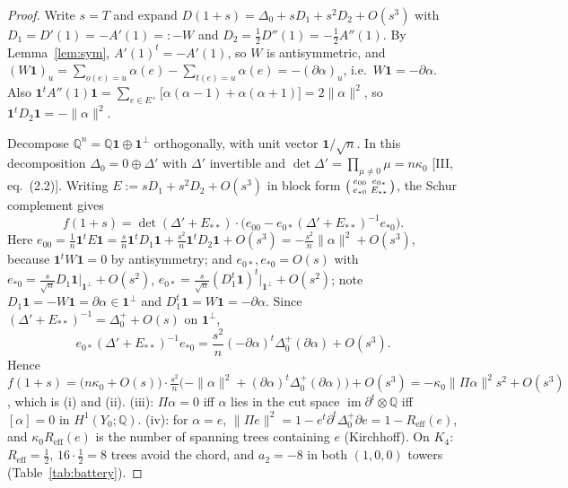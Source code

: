 \documentclass[11pt]{amsart}
\numberwithin{equation}{section}
\theoremstyle{definition}
\theoremstyle{remark}
\newcommand{\Q}{\mathbb{Q}}
\newcommand{\Reff}{R_{\mathrm{eff}}}
\begin{document}
\begin{proof}
Write $s=T$ and expand $D(1+s)=\Delta_0+sD_1+s^{2}D_2+O(s^{3})$ with
$D_1=D'(1)=-A'(1)=:-W$ and $D_2=\frac12D''(1)=-\frac12A''(1)$. By
Lemma~\ref{lem:sym}, $A'(1)^{t}=-A'(1)$, so $W$ is antisymmetric, and
$(W\mathbf1)_u=\sum_{o(e)=u}\alpha(e)-\sum_{t(e)=u}\alpha(e)=-(\partial\alpha)_u$, i.e.\
$W\mathbf1=-\partial\alpha$. Also
$\mathbf1^{t}A''(1)\mathbf1=\sum_{e\in E^+}\bigl[\alpha(\alpha-1)+\alpha(\alpha+1)\bigr]
=2\|\alpha\|^{2}$, so $\mathbf1^{t}D_2\mathbf1=-\|\alpha\|^{2}$.

Decompose $\Q^{n}=\Q\mathbf1\oplus\mathbf1^{\perp}$ orthogonally, with unit vector
$\mathbf1/\sqrt n$. In this decomposition $\Delta_0=0\oplus\Delta'$ with $\Delta'$
invertible and $\det\Delta'=\prod_{\mu\neq0}\mu=n\kappa_0$ [III, eq.~(2.2)]. Writing
$E:=sD_1+s^{2}D_2+O(s^{3})$ in block form $\begin{psmallmatrix}e_{00}&e_{0*}\\
e_{*0}&E_{**}\end{psmallmatrix}$, the Schur complement gives
\[
f(1+s)=\det(\Delta'+E_{**})\cdot\bigl(e_{00}-e_{0*}(\Delta'+E_{**})^{-1}e_{*0}\bigr).
\]
Here $e_{00}=\frac1n\mathbf1^{t}E\mathbf1=\frac{s}{n}\mathbf1^{t}D_1\mathbf1
+\frac{s^{2}}n\mathbf1^{t}D_2\mathbf1+O(s^{3})=-\frac{s^{2}}n\|\alpha\|^{2}+O(s^{3})$,
because $\mathbf1^{t}W\mathbf1=0$ by antisymmetry; and $e_{0*},e_{*0}=O(s)$ with
$e_{*0}=\frac{s}{\sqrt n}D_1\mathbf1|_{\mathbf1^\perp}+O(s^{2})$,
$e_{0*}=\frac{s}{\sqrt n}(D_1^{t}\mathbf1)^{t}|_{\mathbf1^\perp}+O(s^{2})$; note
$D_1\mathbf1=-W\mathbf1=\partial\alpha\in\mathbf1^{\perp}$ and
$D_1^{t}\mathbf1=W\mathbf1=-\partial\alpha$. Since $(\Delta'+E_{**})^{-1}=\Delta_0^{+}
+O(s)$ on $\mathbf1^{\perp}$,
\[
e_{0*}(\Delta'+E_{**})^{-1}e_{*0}
=\frac{s^{2}}n(-\partial\alpha)^{t}\Delta_0^{+}(\partial\alpha)+O(s^{3}) .
\]
Hence
$f(1+s)=\bigl(n\kappa_0+O(s)\bigr)\cdot\frac{s^{2}}{n}\bigl(-\|\alpha\|^{2}
+(\partial\alpha)^{t}\Delta_0^{+}(\partial\alpha)\bigr)+O(s^{3})
=-\kappa_0\|\Pi\alpha\|^{2}s^{2}+O(s^{3})$, which is (i) and (ii). (iii): $\Pi\alpha=0$
iff $\alpha$ lies in the cut space $\operatorname{im}\partial^{t}\otimes\Q$ iff
$[\alpha]=0$ in $H^{1}(Y_0;\Q)$. (iv): for $\alpha=e$,
$\|\Pi e\|^{2}=1-e^{t}\partial^{t}\Delta_0^{+}\partial e=1-\Reff(e)$, and
$\kappa_0\Reff(e)$ is the number of spanning trees containing $e$ (Kirchhoff). On $K_4$:
$\Reff=\frac12$, $16\cdot\frac12=8$ trees avoid the chord, and $a_2=-8$ in both
$(1,0,0)$ towers (Table~\ref{tab:battery}).
\end{proof}
\end{document}
